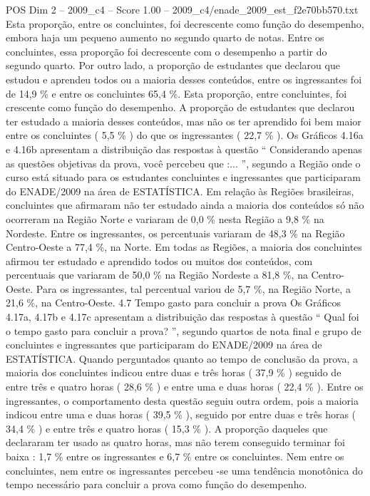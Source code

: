 \begin{textsample}{POS Dim 2 – 2009\_c4 – Score 1.00 – 2009\_c4/enade\_2009\_est\_f2e70bb570.txt}
Esta proporção, entre os concluintes, foi decrescente como função do desempenho, embora haja um pequeno aumento no segundo quarto de notas.
Entre os concluintes, essa proporção foi decrescente com o desempenho a partir do segundo quarto.
Por outro lado, a proporção de estudantes que declarou que estudou e aprendeu todos ou a maioria desses conteúdos, entre os ingressantes foi de 14,9 \% e entre os concluintes 65,4 \%.
Esta proporção, entre concluintes, foi crescente como função do desempenho.
A proporção de estudantes que declarou ter estudado a maioria desses conteúdos, mas não os ter aprendido foi bem maior entre os concluintes ( 5,5 \% ) do que os ingressantes ( 22,7 \% ).
Os Gráficos 4.16a e 4.16b apresentam a distribuição das respostas à questão “ Considerando apenas as questões objetivas da prova, você percebeu que :... ”, segundo a Região onde o curso está situado para os estudantes concluintes e ingressantes que participaram do ENADE/2009 na área de ESTATÍSTICA.
Em relação às Regiões brasileiras, concluintes que afirmaram não ter estudado ainda a maioria dos conteúdos só não ocorreram na Região Norte e variaram de 0,0 \% nesta Região a 9,8 \% na Nordeste.
Entre os ingressantes, os percentuais variaram de 48,3 \% na Região Centro-Oeste a 77,4 \%, na Norte.
Em todas as Regiões, a maioria dos concluintes afirmou ter estudado e aprendido todos ou muitos dos conteúdos, com percentuais que variaram de 50,0 \% na Região Nordeste a 81,8 \%, na Centro-Oeste.
Para os ingressantes, tal percentual variou de 5,7 \%, na Região Norte, a 21,6 \%, na Centro-Oeste. 4.7 Tempo gasto para concluir a prova Os Gráficos 4.17a, 4.17b e 4.17c apresentam a distribuição das respostas à questão “ Qual foi o tempo gasto para concluir a prova? ”, segundo quartos de nota final e grupo de concluintes e ingressantes que participaram do ENADE/2009 na área de ESTATÍSTICA.
Quando perguntados quanto ao tempo de conclusão da prova, a maioria dos concluintes indicou entre duas e três horas ( 37,9 \% ) seguido de entre três e quatro horas ( 28,6 \% ) e entre uma e duas horas ( 22,4 \% ).
Entre os ingressantes, o comportamento desta questão seguiu outra ordem, pois a maioria indicou entre uma e duas horas ( 39,5 \% ), seguido por entre duas e três horas ( 34,4 \% ) e entre três e quatro horas ( 15,3 \% ).
A proporção daqueles que declararam ter usado as quatro horas, mas não terem conseguido terminar foi baixa : 1,7 \% entre os ingressantes e 6,7 \% entre os concluintes.
Nem entre os concluintes, nem entre os ingressantes percebeu -se uma tendência monotônica do tempo necessário para concluir a prova como função do desempenho.

\end{textsample}
